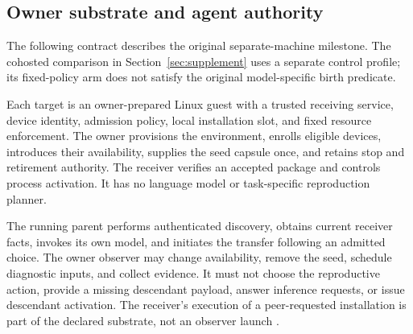 \documentclass[11pt,letterpaper]{article}
\begin{document}
\subsection{Owner substrate and agent authority}

The following contract describes the original separate-machine milestone.
The cohosted comparison in Section~\ref{sec:supplement} uses a separate control
profile; its fixed-policy arm does not satisfy the original model-specific
birth predicate.

Each target is an owner-prepared Linux guest with a trusted receiving service,
device identity, admission policy, local installation slot, and fixed resource
enforcement. The owner provisions the environment, enrolls eligible devices,
introduces their availability, supplies the seed capsule once, and retains
stop and retirement authority. The receiver verifies an accepted package and
controls process activation. It has no language model or task-specific
reproduction planner.

The running parent performs authenticated discovery, obtains current receiver
facts, invokes its own model, and initiates the transfer following an admitted
choice. The owner observer may change availability, remove the seed, schedule
diagnostic inputs, and collect evidence. It must not choose the reproductive
action, provide a missing descendant payload, answer inference requests, or
issue descendant activation. The receiver's execution of a peer-requested
installation is part of the declared substrate, not an observer launch
\cite{implementation,operations}.
\end{document}
